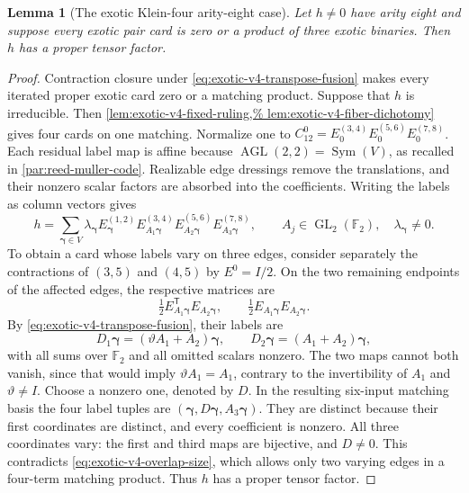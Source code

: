 \documentclass[11pt,letterpaper,onecolumn]{article}
\theoremstyle{plain}
\newtheorem{lemma}[lemma]{Lemma}
\theoremstyle{definition}
\theoremstyle{remark}
\newcommand{\Ftwo}{\mathbb F_2}
\newcommand{\GL}{\operatorname{GL}}
\begin{document}
\begin{lemma}[The exotic Klein-four arity-eight case]
\label{lem:exotic-v4-q8}
Let \(h\ne0\) have arity eight and suppose every exotic pair card is zero
or a product of three exotic binaries.  Then \(h\) has a proper tensor
factor.
\end{lemma}

\begin{proof}
Contraction closure under \cref{eq:exotic-v4-transpose-fusion} makes every
iterated proper exotic card zero or a matching product. Suppose that
\(h\) is irreducible. Then \cref{lem:exotic-v4-fixed-ruling,%
lem:exotic-v4-fiber-dichotomy} gives four cards on one matching.  Normalize
one to \(C_{12}^0=E_0^{(3,4)}E_0^{(5,6)}E_0^{(7,8)}\).  Each residual label map is affine because
\(\operatorname{AGL}(2,2)=\operatorname{Sym}(V)\), as recalled in
\cref{par:reed-muller-code}. Realizable edge dressings remove the
translations, and their nonzero scalar factors are absorbed into the
coefficients. Writing the labels as column vectors gives
\begin{equation}
 h=\sum_{\boldsymbol{\gamma}\in V}\lambda_{\boldsymbol{\gamma}}
 E_{\boldsymbol{\gamma}}^{(1,2)}E_{A_1\boldsymbol{\gamma}}^{(3,4)}
 E_{A_2\boldsymbol{\gamma}}^{(5,6)}E_{A_3\boldsymbol{\gamma}}^{(7,8)},
 \qquad
 A_j\in\GL_2(\Ftwo),\quad \lambda_{\boldsymbol{\gamma}}\ne0.
 \label{eq:exotic-v4-q8-linear-normal-form}
\end{equation}
To obtain a card whose labels vary on three edges, consider separately the contractions
of \((3,5)\) and \((4,5)\) by \(E^0=I/2\).  On the two remaining
endpoints of the affected edges, the respective matrices are
\[
 \tfrac12 E_{A_1\boldsymbol{\gamma}}^{\mathsf T}E_{A_2\boldsymbol{\gamma}},
 \qquad \tfrac12 E_{A_1\boldsymbol{\gamma}}E_{A_2\boldsymbol{\gamma}}.
\]
By \cref{eq:exotic-v4-transpose-fusion}, their labels are
\[
 D_1\boldsymbol{\gamma}=(\vartheta A_1+A_2)\boldsymbol{\gamma},
 \qquad D_2\boldsymbol{\gamma}=(A_1+A_2)\boldsymbol{\gamma},
\]
with all sums over \(\Ftwo\) and all omitted scalars nonzero.
The two maps cannot both vanish, since that would imply
\(\vartheta A_1=A_1\), contrary to the invertibility of \(A_1\) and
\(\vartheta\ne I\).  Choose a nonzero one, denoted by \(D\).
In the resulting six-input matching basis the four label tuples are
\( (\boldsymbol{\gamma},D\boldsymbol{\gamma},A_3\boldsymbol{\gamma})\).
They are distinct because their first coordinates are distinct, and every
coefficient is nonzero.  All three coordinates vary: the first and third
maps are bijective, and \(D\ne0\).  This contradicts
\cref{eq:exotic-v4-overlap-size}, which allows only two varying edges in
a four-term matching product.  Thus \(h\) has a proper tensor factor.
\end{proof}
\end{document}
